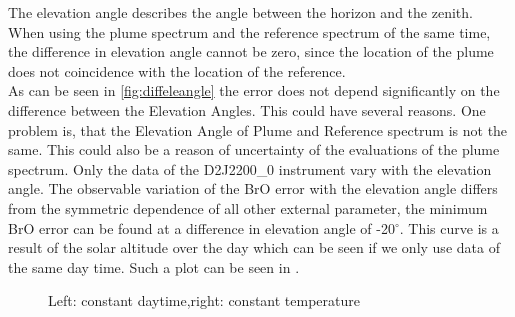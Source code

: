 \documentclass  [
  paper    = a4,
  BCOR     = 10mm,
  twoside,
  fontsize = 12pt,
  fleqn,
  toc      = bibnumbered,
  toc      = listofnumbered,
  numbers  = noendperiod,
  headings = normal,
  listof   = leveldown,
  version  = 3.03
]                                       {scrreprt}
\begin{document}
	The elevation angle describes the angle between the horizon and the zenith. When using the plume spectrum and the reference spectrum of the same time, the difference in elevation angle cannot be zero, since the location of the plume does not coincidence with the location of the reference.\\
	As can be seen in \cref{fig:diffeleangle} the  error does not depend significantly on the difference between the Elevation Angles. This could have several reasons. One problem is, that the Elevation Angle of Plume and Reference spectrum is not the same. This could also be a reason of uncertainty of the evaluations of the plume spectrum.
	Only the data of the D2J2200\_0 instrument vary with the elevation angle. The observable variation of the BrO error with the elevation angle differs from the symmetric dependence of all other external parameter, the minimum BrO error can be found at a difference in elevation angle of -20$^{\circ}$. This curve is a result of the solar altitude over the day which can be seen if we only use data of the same day time. Such a plot can be seen in \cite{fig:d2j22000diffelevangleonetempnevad}.
	\begin{figure}
		\caption{Left: constant daytime,right: constant temperature}
		\label{fig:d2j22000diffelevangleonetempnevad}
	\end{figure}
	
\end{document}
